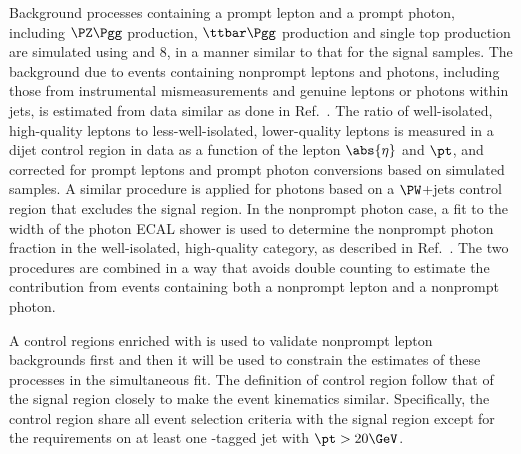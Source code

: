 Background processes containing a prompt lepton and a prompt photon, including $\PZ\Pgg$ production, $\ttbar\Pgg$ production and single top production are simulated using \MGvATNLO and {\PYTHIA}8, in a manner similar to that for the signal samples. The background due to events containing nonprompt leptons and photons, including those from instrumental mismeasurements and genuine leptons or photons within jets, is estimated from data similar as done in Ref.~\cite{CMS:2021foa}. The ratio of well-isolated, high-quality leptons to less-well-isolated, lower-quality leptons is measured in a dijet control region in data as a function of the lepton $\abs{\eta}$ and $\pt$, and corrected for prompt leptons and prompt photon conversions based on simulated samples. A similar procedure is applied for photons based on a $\PW$+jets control region that excludes the signal region. In the nonprompt photon case, a fit to the width of the photon ECAL shower is used to determine the nonprompt photon fraction in the well-isolated, high-quality category, as described in Ref.~\cite{Sirunyan_2020}. The two procedures are combined in a way that avoids double counting to estimate the contribution from events containing both a nonprompt lepton and a nonprompt photon. 

A control regions enriched with {\ttst} is used to validate nonprompt lepton backgrounds first and then it will be used to constrain the estimates of these processes in the simultaneous fit. The definition of {\ttst} control region follow that of the signal region closely to make the event kinematics similar. Specifically, the control region share all event selection criteria with the signal region except for the requirements on at least one {\cPqb}-tagged jet with $\pt > 20\GeV$. 

